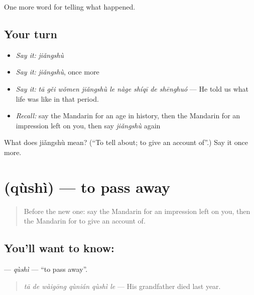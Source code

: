 \begin{grammarlens}[title={What you've built}]
One more word for telling what happened.
\end{grammarlens}

\subsection*{Your turn}
\begin{itemize}
\raggedright
  \item \emph{Say it:} \emph{jiǎngshù}
  \item \emph{Say it:} \emph{jiǎngshù}, once more
  \item \emph{Say it:} \emph{tā gěi wǒmen jiǎngshù le nàge shíqī de shēnghuó} — He told us what life was like in that period.
  \item \emph{Recall:} say the Mandarin for an age in history, then the Mandarin for an impression left on you, then say \emph{jiǎngshù} again
\end{itemize}

\begin{tcolorbox}[breakable,colback=teal!4,colframe=teal!35!black,title={Before you move on}]
What does jiǎngshù mean? (\textquotedblleft{}To tell about; to give an account of\textquotedblright{}.) Say it once more.
\end{tcolorbox}
\section[\texorpdfstring{\zh{去世} (qùshì)}{去世 (qùshì)}]{ (qùshì) — to pass away}

\label{lesson:ZH-C325-qushi}



\begin{quote}
Before the new one: say the Mandarin for an impression left on you, then the Mandarin for to give an account of.
\end{quote}

\subsection*{You'll want to know: }
\textbf{} — \emph{qùshì} — \textquotedblleft{}to pass away\textquotedblright{}.

\begin{quote}
\textbf{} \emph{tā de wàigōng qùnián qùshì le} — His grandfather died last year.
\end{quote}

